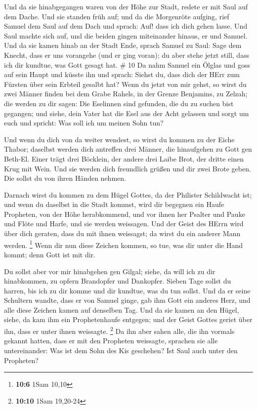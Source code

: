  Und da sie hinabgegangen waren von der Höhe zur Stadt,
redete er mit Saul auf dem Dache.  Und sie standen früh
auf; und da die Morgenröte aufging, rief Samuel dem Saul auf dem Dach
und sprach: Auf! dass ich dich gehen lasse. Und Saul machte sich auf,
und die beiden gingen miteinander hinaus, er und Samuel. 
Und da sie kamen hinab an der Stadt Ende, sprach Samuel zu Saul: Sage
dem Knecht, dass er uns vorangehe (und er ging voran); du aber stehe
jetzt still, dass ich dir kundtue, was Gott gesagt hat. \# 10
 Da nahm Samuel ein Ölglas und goss auf sein Haupt und
küsste ihn und sprach: Siehst du, dass dich der HErr zum Fürsten über
sein Erbteil gesalbt hat?  Wenn du jetzt von mir gehst, so
wirst du zwei Männer finden bei dem Grabe Rahels, in der Grenze
Benjamins, zu Zelzah; die werden zu dir sagen: Die Eselinnen sind
gefunden, die du zu suchen bist gegangen; und siehe, dein Vater hat die
Esel aus der Acht gelassen und sorgt um euch und spricht: Was soll ich
um meinen Sohn tun?

 Und wenn du dich von da weiter wendest, so wirst du kommen
zu der Eiche Thabor; daselbst werden dich antreffen drei Männer, die
hinaufgehen zu Gott gen Beth-El. Einer trägt drei Böcklein, der andere
drei Laibe Brot, der dritte einen Krug mit Wein.  Und sie
werden dich freundlich grüßen und dir zwei Brote geben. Die sollst du
von ihren Händen nehmen.

 Darnach wirst du kommen zu dem Hügel Gottes, da der
Philister Schildwacht ist; und wenn du daselbst in die Stadt kommst,
wird dir begegnen ein Haufe Propheten, von der Höhe herabkommend, und
vor ihnen her Psalter und Pauke und Flöte und Harfe, und sie werden
weissagen.  Und der Geist des HErrn wird über dich geraten,
dass du mit ihnen weissagst; da wirst du ein anderer Mann werden.
\footnote{\textbf{10:6} 1Sam 10,10}  Wenn dir nun diese
Zeichen kommen, so tue, was dir unter die Hand kommt; denn Gott ist mit
dir.

 Du sollst aber vor mir hinabgehen gen Gilgal; siehe, da
will ich zu dir hinabkommen, zu opfern Brandopfer und Dankopfer. Sieben
Tage sollst du harren, bis ich zu dir komme und dir kundtue, was du tun
sollst.  Und da er seine Schultern wandte, dass er von
Samuel ginge, gab ihm Gott ein anderes Herz, und alle diese Zeichen
kamen auf denselben Tag.  Und da sie kamen an den Hügel,
siehe, da kam ihm ein Prophetenhaufe entgegen; und der Geist Gottes
geriet über ihn, dass er unter ihnen weissagte. \footnote{\textbf{10:10}
  1Sam 19,20-24}  Da ihn aber sahen alle, die ihn vormals
gekannt hatten, dass er mit den Propheten weissagte, sprachen sie alle
untereinander: Was ist dem Sohn des Kis geschehen? Ist Saul auch unter
den Propheten?

